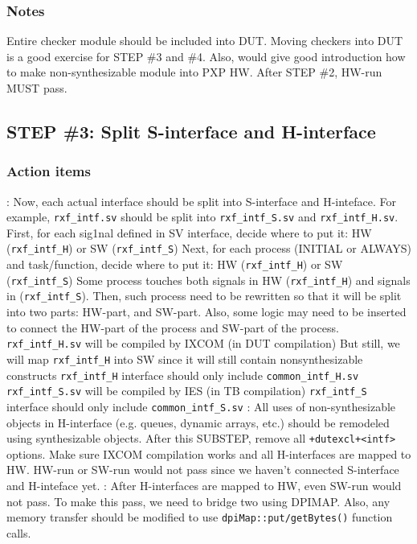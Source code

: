 \documentclass{note}
\begin{document}
\subsubsection{Notes}
\bit
\w Entire checker module should be included into DUT.
  Moving checkers into DUT is a good exercise for STEP \#3 and \#4. Also,
  would give good introduction how to make non-synthesizable module into 
  PXP HW.
\w \textcolor{red2}{After STEP \#2, HW-run MUST pass}.
\eit

\subsection{STEP \#3: Split S-interface and H-interface}
\subsubsection{Action items}
\bit
\w {}: Now, each actual interface should be split into S-interface
and H-inteface. For example, \verb+rxf_intf.sv+ should be split into
\verb+rxf_intf_S.sv+ and \verb+rxf_intf_H.sv+. 
   \bit
   \w First, for each sig1nal defined in SV interface, decide where to put it: 
    HW (\verb+rxf_intf_H+) or SW (\verb+rxf_intf_S+)
   \w Next, for each process (INITIAL or ALWAYS) and task/function, decide
   where to put it:
    HW (\verb+rxf_intf_H+) or SW (\verb+rxf_intf_S+)
      \bit
      \w Some process touches both signals in HW (\verb+rxf_intf_H+) and
      signals in (\verb+rxf_intf_S+). 
      \w  Then, such process need to be rewritten so that it will be split
      into two parts: HW-part, and SW-part. 
      \w Also, some logic may need to be inserted to connect the HW-part of the
      process and SW-part of the process.
      \eit
   \w \verb+rxf_intf_H.sv+ will be compiled by IXCOM (in DUT compilation)
     \bit
     \w But still, we will map \verb+rxf_intf_H+ into SW since it will still
        contain nonsynthesizable constructs
     \w \verb+rxf_intf_H+ interface should only include \verb+common_intf_H.sv+
     \eit
   \w \verb+rxf_intf_S.sv+ will be compiled by IES (in TB compilation)
     \bit
     \w \verb+rxf_intf_S+ interface should only include
     \verb+common_intf_S.sv+
     \eit
   \eit
\w {}:
  \bit
  \w All uses of non-synthesizable objects in H-interface (e.g. queues,
  dynamic arrays, etc.) should be remodeled using synthesizable objects.
  \w After this SUBSTEP, remove all \verb|+dutexcl+<intf>| options. 
    Make sure IXCOM compilation works and all
    H-interfaces are mapped to HW. HW-run or SW-run would not pass since we
    haven't connected S-interface and H-inteface yet. 
  \eit
\w {}:
  \bit
  \w After H-interfaces are mapped to HW, even SW-run would not pass. To make
  this pass, we need to bridge two using DPIMAP.
  \w Also, any memory transfer should be modified to use
  \verb+dpiMap::put/getBytes()+ function calls.
  \eit
\eit
\end{document}
